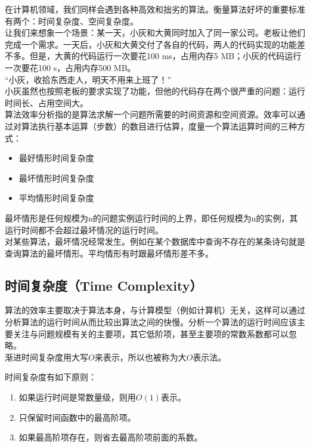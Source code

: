 在计算机领域，我们同样会遇到各种高效和拙劣的算法。衡量算法好坏的重要标准有两个：时间复杂度、空间复杂度。 \\

让我们来想象一个场景：某一天，小灰和大黄同时加入了同一家公司。老板让他们完成一个需求。一天后，小灰和大黄交付了各自的代码，两人的代码实现的功能差不多。但是，大黄的代码运行一次要花100 ms，占用内存5 MB；小灰的代码运行一次要花100 s，占用内存500 MB。 \\

“小灰，收拾东西走人，明天不用来上班了！” \\

小灰虽然也按照老板的要求实现了功能，但他的代码存在两个很严重的问题：运行时间长、占用空间大。 \\

算法效率分析指的是算法求解一个问题所需要的时间资源和空间资源。效率可以通过对算法执行基本运算（步数）的数目进行估算，度量一个算法运算时间的三种方式：

\begin{itemize}
	\item 最好情形时间复杂度
	\item 最坏情形时间复杂度
	\item 平均情形时间复杂度
\end{itemize}

最坏情形是任何规模为n的问题实例运行时间的上界，即任何规模为n的实例，其运行时间都不会超过最坏情况的运行时间。 \\

对某些算法，最坏情况经常发生。例如在某个数据库中查询不存在的某条诗句就是查询算法的最坏情形。平均情形有时跟最坏情形差不多。

\subsection{时间复杂度（Time Complexity）}

算法的效率主要取决于算法本身，与计算模型（例如计算机）无关，这样可以通过分析算法的运行时间从而比较出算法之间的快慢。分析一个算法的运行时间应该主要关注与问题规模有关的主要项，其它低阶项，甚至主要项的常数系数都可以忽略。 \\

渐进时间复杂度用大写$ O $来表示，所以也被称为大$ O $表示法。

时间复杂度有如下原则：

\begin{enumerate}
	\item 如果运行时间是常数量级，则用$ O(1) $表示。
	\item 只保留时间函数中的最高阶项。
	\item 如果最高阶项存在，则省去最高阶项前面的系数。
\end{enumerate}

